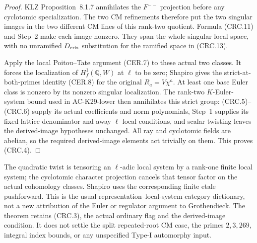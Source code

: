 \begin{proof}
KLZ Proposition~8.1.7 annihilates the $F^{--}$
projection before any cyclotomic specialization.
The two CM refinements therefore put the two
singular images in the two different CM lines of
this rank-two quotient.  Formula (CRC.11) and
Step~2 make each image nonzero.  They span the
whole singular local space, with no unramified
$D_{\rm cris}$ substitution for the ramified
space in (CRC.13).

Apply the local Poitou--Tate argument (CER.7) to
these actual two classes.  It forces the localization
of $H^1_f(\mathbb Q,W)$ at $\ell$ to be zero; Shapiro
gives the strict-at-both-primes identity (CER.8) for
the original $R_a=V\chi^a$.
At least one base Euler class is nonzero by its
nonzero singular localization.  The rank-two
$K$-Euler-system bound used in AC-K29-lower then
annihilates this strict group: (CRC.5)--(CRC.6)
supply its actual coefficients and norm polynomials,
Step~1 supplies its fixed lattice denominator and
away-$\ell$ local conditions, and scalar twisting
leaves the derived-image hypotheses unchanged.
All ray and cyclotomic fields are abelian, so the
required derived-image elements act trivially on
them.  This proves (CRC.4).
\end{proof}

\begin{remark}
The quadratic twist is tensoring an $\ell$-adic local
system by a rank-one finite local system; the
cyclotomic character projection cancels that tensor
factor on the actual cohomology classes.  Shapiro
uses the corresponding finite etale pushforward.
This is the usual representation--local-system
category dictionary, not a new attribution of the
Euler or regulator argument to Grothendieck.
The theorem retains (CRC.3), the actual ordinary
flag and the derived-image condition.  It does not
settle the split repeated-root CM case, the primes
$2,3,269$, integral index bounds, or any unspecified
Type-I automorphy input.
\end{remark}
